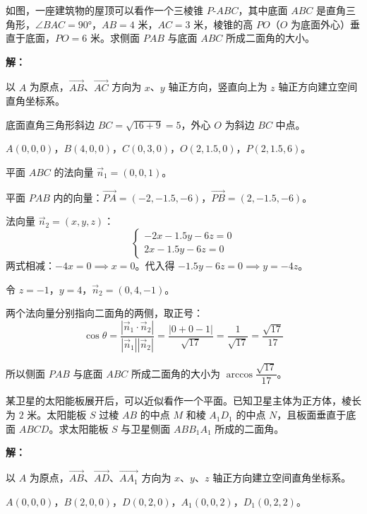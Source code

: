 \documentclass[12pt, a4paper]{ctexart}
\begin{document}
\begin{appbox}[【应用1】建筑中的角度问题]
如图，一座建筑物的屋顶可以看作一个三棱锥 $P$-$ABC$，其中底面 $ABC$ 是直角三角形，$\angle BAC=90°$，$AB=4$ 米，$AC=3$ 米，棱锥的高 $PO$（$O$ 为底面外心）垂直于底面，$PO=6$ 米。求侧面 $PAB$ 与底面 $ABC$ 所成二面角的大小。
\end{appbox}

\textbf{解：}

以 $A$ 为原点，$\overrightarrow{AB}$、$\overrightarrow{AC}$ 方向为 $x$、$y$ 轴正方向，竖直向上为 $z$ 轴正方向建立空间直角坐标系。

底面直角三角形斜边 $BC=\sqrt{16+9}=5$，外心 $O$ 为斜边 $BC$ 中点。

$A(0,0,0)$，$B(4,0,0)$，$C(0,3,0)$，$O(2,1.5,0)$，$P(2,1.5,6)$。

平面 $ABC$ 的法向量 $\vec{n}_1=(0,0,1)$。

平面 $PAB$ 内的向量：$\overrightarrow{PA}=(-2,-1.5,-6)$，$\overrightarrow{PB}=(2,-1.5,-6)$。

法向量 $\vec{n}_2=(x,y,z)$：
\[
\begin{cases}
-2x-1.5y-6z=0\\
2x-1.5y-6z=0
\end{cases}
\]
两式相减：$-4x=0\implies x=0$。代入得 $-1.5y-6z=0\implies y=-4z$。

令 $z=-1$，$y=4$，$\vec{n}_2=(0,4,-1)$。

两个法向量分别指向二面角的两侧，取正号：
\[
\cos\theta=\frac{|\vec{n}_1\cdot\vec{n}_2|}{|\vec{n}_1||\vec{n}_2|}=\frac{|0+0-1|}{\sqrt{17}}=\frac{1}{\sqrt{17}}=\frac{\sqrt{17}}{17}
\]

所以侧面 $PAB$ 与底面 $ABC$ 所成二面角的大小为 $\arccos\dfrac{\sqrt{17}}{17}$。

\begin{appbox}[【应用2】卫星太阳能板的安装角度]
某卫星的太阳能板展开后，可以近似看作一个平面。已知卫星主体为正方体，棱长为 $2$ 米。太阳能板 $S$ 过棱 $AB$ 的中点 $M$ 和棱 $A_1D_1$ 的中点 $N$，且板面垂直于底面 $ABCD$。求太阳能板 $S$ 与卫星侧面 $ABB_1A_1$ 所成的二面角。
\end{appbox}

\textbf{解：}

以 $A$ 为原点，$\overrightarrow{AB}$、$\overrightarrow{AD}$、$\overrightarrow{AA_1}$ 方向为 $x$、$y$、$z$ 轴正方向建立空间直角坐标系。

$A(0,0,0)$，$B(2,0,0)$，$D(0,2,0)$，$A_1(0,0,2)$，$D_1(0,2,2)$。
\end{document}
